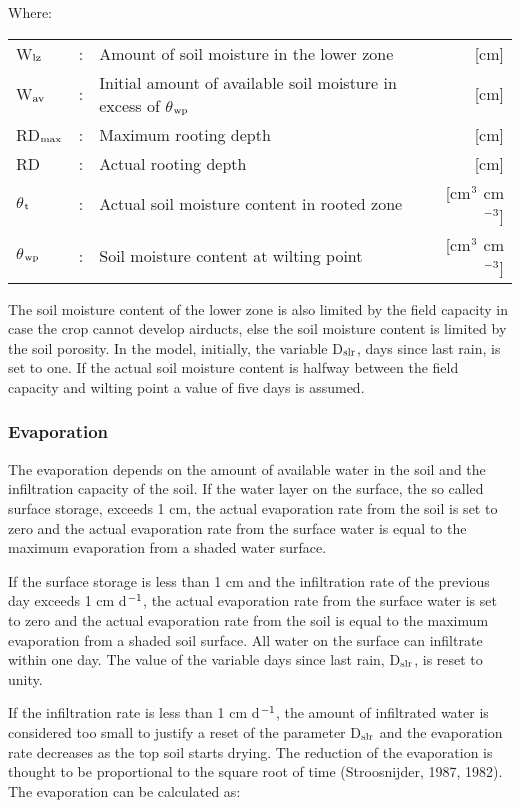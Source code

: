 Where:\\[5pt]
\begin{tabularx}{\textwidth}{llXr}
	W$_{{\rm lz}}$ &:& Amount of soil moisture in the lower zone & [cm]\\
	W$_{{\rm av}}$ &:& Initial amount of available soil moisture 
	in excess of $\theta$$_{{\rm wp}}$ & [cm]\\
	RD$_{{\rm max}}$ &:& Maximum rooting depth & [cm]\\
	RD &:& Actual rooting depth & [cm]\\
	$\theta$$_{{\rm t}}$ &:& Actual soil moisture content in rooted zone  
	& [cm$^{{\rm 3}}$ cm$^{{\rm -3}}$]\\
	$\theta$$_{{\rm wp}}$ &:& Soil moisture content at wilting point  
	& [cm$^{{\rm 3}}$ cm$^{{\rm -3}}$]\\
\end{tabularx}

The soil moisture content of the lower zone is also limited by the field capacity in case
the crop cannot develop airducts, else the soil moisture content is limited by the soil
porosity. In the model, initially, the variable D$_{{\rm slr}}$, days since last rain, is set 
to one. If the
actual soil moisture content is halfway between the field capacity and wilting point a
value of five days is assumed. 

\subsubsection{Evaporation}
\label{sec:evaporation}
The evaporation depends on the amount of available water in the soil and the infiltration
capacity of the soil. If the water layer on the surface, the so called surface storage, 
exceeds 1 cm, the actual evaporation rate from the soil is set to zero and the actual
evaporation rate from the surface water is equal to the maximum evaporation from a
shaded water surface.

If the surface storage is less than 1 cm and the infiltration rate of the previous day
exceeds 1 cm d$^{{\rm -1}}$, the actual evaporation rate from the surface water is set to zero and the
actual evaporation rate from the soil is equal to the maximum evaporation from a shaded
soil surface. All water on the surface can infiltrate within one day. The value of the
variable days since last rain, D$_{{\rm slr}}$, is reset to unity.

If the infiltration rate is less than 1 cm d$^{{\rm -1}}$, the amount of infiltrated water is considered
too small to justify a reset of the parameter D$_{{\rm slr}}$ and the evaporation rate decreases as the
top soil starts drying. The reduction of the evaporation is thought to be proportional to the
square root of time (Stroosnijder, 1987, 1982). The evaporation can be calculated as:

